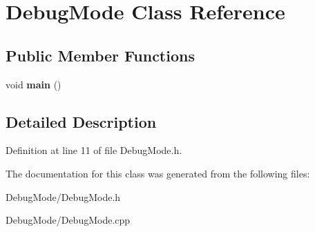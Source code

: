 \section{Debug\+Mode Class Reference}
\label{class_debug_mode}
\subsection*{Public Member Functions}
\begin{DoxyCompactItemize}
\item 
void {\bfseries main} ()\label{class_debug_mode_a78e754c865c623b185def82f4d1431cb}

\end{DoxyCompactItemize}


\subsection{Detailed Description}


Definition at line 11 of file Debug\+Mode.\+h.



The documentation for this class was generated from the following files\+:\begin{DoxyCompactItemize}
\item 
Debug\+Mode/Debug\+Mode.\+h\item 
Debug\+Mode/Debug\+Mode.\+cpp\end{DoxyCompactItemize}
